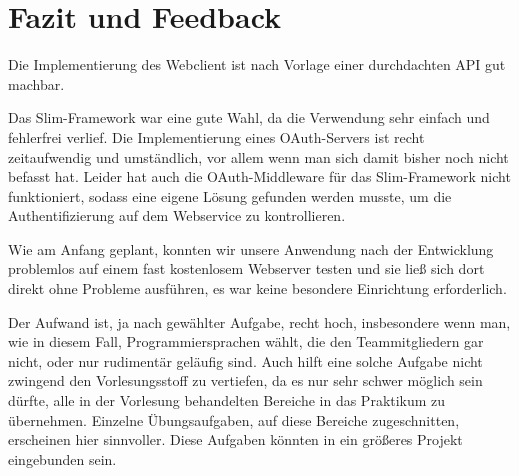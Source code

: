 \chapter{Fazit und Feedback}

Die Implementierung des Webclient ist nach Vorlage einer durchdachten API gut machbar.

Das Slim-Framework war eine gute Wahl, da die Verwendung sehr einfach und fehlerfrei verlief. Die Implementierung eines OAuth-Servers ist recht zeitaufwendig und umständlich, vor allem wenn man sich damit bisher noch nicht befasst hat. Leider hat auch die OAuth-Middleware für das Slim-Framework nicht funktioniert, sodass eine eigene Lösung gefunden werden musste, um die Authentifizierung auf dem Webservice zu kontrollieren.

Wie am Anfang geplant, konnten wir unsere Anwendung nach der Entwicklung problemlos auf einem fast kostenlosem Webserver testen und sie ließ sich dort direkt ohne Probleme ausführen, es war keine besondere Einrichtung erforderlich. 

Der Aufwand ist, ja nach gewählter Aufgabe, recht hoch, insbesondere wenn man, wie in diesem Fall, Programmiersprachen wählt, die den Teammitgliedern gar nicht, oder nur rudimentär geläufig sind.
Auch hilft eine solche Aufgabe nicht zwingend den Vorlesungsstoff zu vertiefen, da es nur sehr schwer möglich sein dürfte, alle in der Vorlesung behandelten Bereiche in das Praktikum zu übernehmen.
Einzelne Übungsaufgaben, auf diese Bereiche zugeschnitten, erscheinen hier sinnvoller.
Diese Aufgaben könnten in ein größeres Projekt eingebunden sein.



